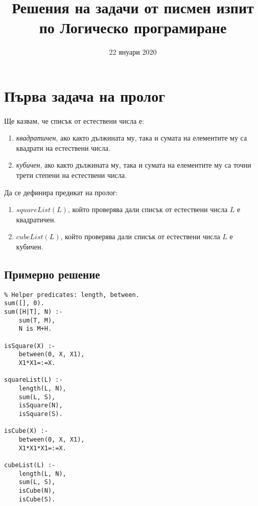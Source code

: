 \documentclass[12pt]{article}
\title{Решения на задачи от писмен изпит по Логическо програмиране}
\date{22 януари 2020}
\newenvironment{longlisting}{\captionsetup{type=listing}}{}
\begin{document}
\maketitle %
\newpage
{} %
\newpage %
\section{Първа задача на пролог}
\paragraph{}
Ще казвам, че списък от естествени числа е:
\begin{enumerate}
    \item\emph{квадратичен}, ако както дължината му, 
    така и сумата на елементите му са квадрати на естествени числа.
    \item\emph{кубичен}, ако както дължината му, 
    така и сумата на елементите му са точни трети степени на естествени числа.
\end{enumerate}

Да се дефинира предикат на пролог:
\begin{enumerate}
    \item$squareList(L)$, който проверява дали списък от естествени числа $L$ е квадратичен.
    \item$cubeList(L)$, който проверява дали списък от естествени числа $L$ е кубичен.
\end{enumerate}
\subsection{Примерно решение}
\begin{longlisting}
\begin{verbatim}
% Helper predicates: length, between.
sum([], 0).
sum([H|T], N) :-
    sum(T, M),
    N is M+H.

isSquare(X) :-
    between(0, X, X1),
    X1*X1=:=X.

squareList(L) :-
    length(L, N),
    sum(L, S),
    isSquare(N),
    isSquare(S).

isCube(X) :-
    between(0, X, X1),
    X1*X1*X1=:=X.

cubeList(L) :-
    length(L, N),
    sum(L, S),
    isCube(N),
    isCube(S).
\end{verbatim}
\end{longlisting}
\end{document}
